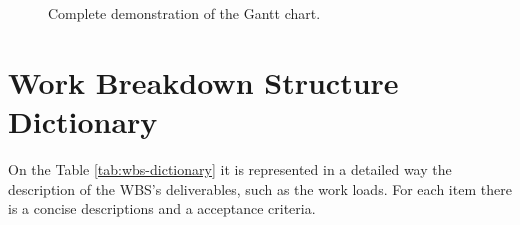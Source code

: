 \begin{figure}
    \centering
    \caption{Complete demonstration of the Gantt chart.}
    \label{fig:gantt_complete}
\end{figure}

\section{Work Breakdown Structure Dictionary}

On the Table \ref{tab:wbs-dictionary} it is represented in a detailed way the description of the \gls{WBS}'s deliverables, such as the work loads. For each item there is a concise descriptions and a acceptance criteria.


